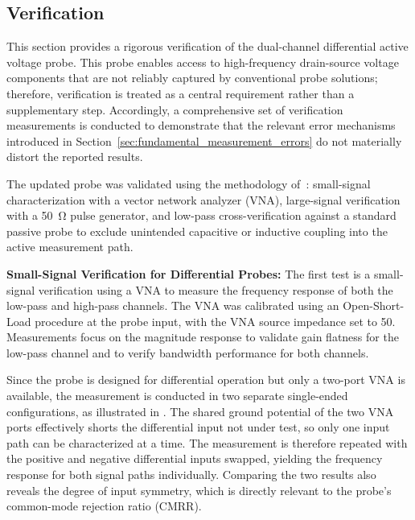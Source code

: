 
\subsection{Verification}
This section provides a rigorous verification of the dual-channel differential active voltage probe.
This probe enables access to high-frequency drain-source voltage components that are not reliably captured by conventional probe solutions; therefore, verification is treated as a central requirement rather than a supplementary step.
Accordingly, a comprehensive set of verification measurements is conducted to demonstrate that the relevant error mechanisms introduced in Section~\ref{sec:fundamental_measurement_errors} do not materially distort the reported results.

The updated probe was validated using the methodology of~\cite{kragl_active_2025}: small-signal characterization with a vector network analyzer (VNA), large-signal verification with a \SI{50}{\ohm} pulse generator, and low-pass cross-verification against a standard passive probe to exclude unintended capacitive or inductive coupling into the active measurement path.









\textbf{Small-Signal Verification for Differential Probes:}
The first test is a small-signal verification using a VNA to measure the frequency response of both the low-pass and high-pass channels.
The VNA was calibrated using an Open-Short-Load procedure at the probe input, with the VNA source impedance set to \SI{50}{\Omega}.
Measurements focus on the magnitude response to validate gain flatness for the low-pass channel and to verify bandwidth performance for both channels.

Since the probe is designed for differential operation but only a two-port VNA is available, the measurement is conducted in two separate single-ended configurations, as illustrated in .
The shared ground potential of the two VNA ports effectively shorts the differential input not under test, so only one input path can be characterized at a time.
The measurement is therefore repeated with the positive and negative differential inputs swapped, yielding the frequency response for both signal paths individually.
Comparing the two results also reveals the degree of input symmetry, which is directly relevant to the probe's common-mode rejection ratio (CMRR).

